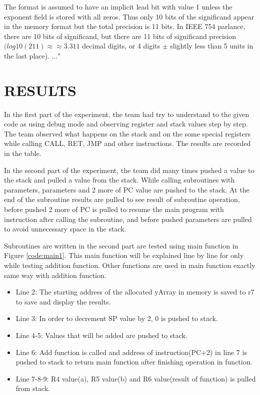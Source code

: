 \documentclass[pdftex,12pt,a4paper]{article}
\begin{document}
The format is assumed to have an implicit lead bit with value 1 unless the exponent field is stored with all zeros. Thus only 10 bits of the significand appear in the memory format but the total precision is 11 bits. In IEEE 754 parlance, there are 10 bits of significand, but there are 11 bits of significand precision ${(log10(211) ≈ {\approx} 3.311}$ decimal digits, or 4 digits ${\pm}$ slightly less than 5 units in the last place). ..."\cite{wiki}

\newpage

\section{RESULTS}%
In the first part of the experiment, the team had try to understand to the given code as using debug mode and observing register and stack values step by step. The team observed what happens on the stack and on the some special registers while calling CALL, RET, JMP and other instructions. The results are recorded in the table.

\newline
In the second part of the experiment, the team did many times pushed a value to the stack and pulled a value from the stack. While calling subroutines with parameters, parameters and 2 more of PC value are pushed to the stack. At the end of the subroutine results are pulled to see result of subroutine operation, before pushed 2 more of PC is pulled to resume the main program with instruction after calling the subroutine, and before pushed parameters are pulled to avoid unnecessary space in the stack.

\newline
Subroutines are written in the second part are tested using main function in Figure \ref{code:main1}.
This main function will be explained line by line for only while testing addition function. Other functions are used in main function exactly same way with addition function.

\begin{itemize}
    \item Line 2: The starting address of the allocated yArray in memory is saved to r7 to save and display the results.
    \item Line 3: In order to decrement SP value by 2, 0 is pushed to stack. 
    \item Line 4-5: Values that will be added are pushed to stack.
    \item Line 6: Add function is called and address of instruction(PC+2) in line 7 is pushed to stack to return main function after finishing operation in function.
    \item Line 7-8-9: R4 value(a), R5 value(b) and R6 value(result of function) is pulled from stack.
\end{itemize}
\end{document}
